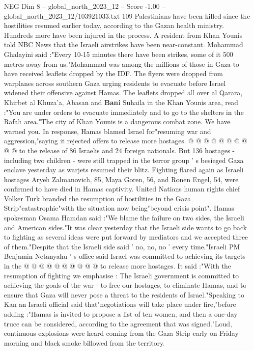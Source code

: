 \begin{textsample}{NEG Dim 8 – global\_north\_2023\_12 – Score -1.00 – global\_north\_2023\_12/103921033.txt}  \label{ex:f8_neg_339}
109 Palestinians have been killed since the hostilities resumed earlier today, according to the Gazan health ministry.
Hundreds more have been injured in the process.
A resident from Khan Younis told NBC News that the Israeli airstrikes have been near-constant.
Mohammad Ghalayini said :"Every 10-15 minutes there have been strikes, some of it 500 metres away from us."Mohammad was among the millions of those in Gaza to have received leaflets dropped by the IDF.
The flyers were dropped from warplanes across southern Gaza urging residents to evacuate before Israel widened their offensive against Hamas.
The leaflets dropped all over al Qarara, Khirbet al Khuza'a, Abasan and \textbf{Bani} Suhaila in the Khan Younis area, read :"You are under orders to evacuate immediately and to go to the shelters in the Rafah area."The city of Khan Younis is a dangerous combat zone.
We have warned you.
In response, Hamas blamed Israel for"resuming war and aggression,"saying it rejected offers to release more hostages. @ @ @ @ @ @ @ @ @ @ to the release of 86 Israelis and 24 foreign nationals.
But 136 hostages - including two children - were still trapped in the terror group ' s besieged Gaza enclave yesterday as warjets resumed their blitz.
Fighting flared again as Israeli hostages Aryeh Zalmanovich, 85, Maya Goren, 56, and Ronen Engel, 54, were confirmed to have died in Hamas captivity.
United Nations human rights chief Volker Turk branded the resumption of hostilities in the Gaza Strip"catastrophic"with the situation now being"beyond crisis point".
Hamas spokesman Osama Hamdan said :"We blame the failure on two sides, the Israeli and American sides."It was clear yesterday that the Israeli side wants to go back to fighting as several ideas were put forward by mediators and we accepted three of them."Despite that the Israeli side said ' no, no, no ' every time."Israeli PM Benjamin Netanyahu ' s office said Israel was committed to achieving its targets in the @ @ @ @ @ @ @ @ @ @ to release more hostages.
It said :"With the resumption of fighting we emphasise : The Israeli government is committed to achieving the goals of the war - to free our hostages, to eliminate Hamas, and to ensure that Gaza will never pose a threat to the residents of Israel."Speaking to Kan an Israeli official said that"negotiations will take place under fire,"before adding :"Hamas is invited to propose a list of ten women, and then a one-day truce can be considered, according to the agreement that was signed."Loud, continuous explosions were heard coming from the Gaza Strip early on Friday morning and black smoke billowed from the territory.

\end{textsample}
